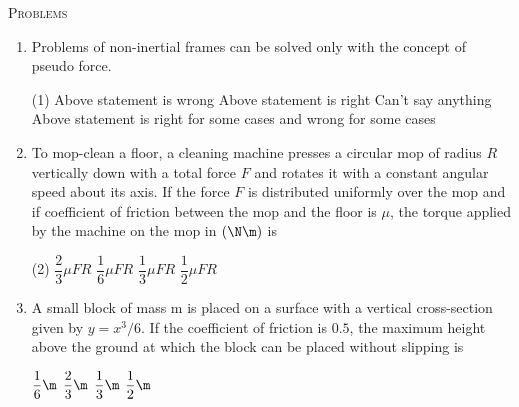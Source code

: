 \documentclass{article}
\renewcommand{\ans}{\quad}
\begin{document}
\begin{center}
    \textsc{Problems}
\end{center}
\begin{enumerate}

    \item Problems of non-inertial frames can be solved only with the concept of pseudo force.
        \begin{tasks}(1)
            \task Above statement is wrong\ans
            \task Above statement is right
            \task Can't say anything
            \task Above statement is right for some cases and wrong for some cases
        \end{tasks}

        \item To mop-clean a floor, a cleaning machine presses a circular mop of radius $R$ vertically down with a total force $F$ and rotates it with a constant angular speed about its axis. If the force $F$ is distributed uniformly over the mop and if coefficient of friction between the mop and the floor is $\mu$, the torque applied by the machine on the mop in $(\N\m)$ is
        \begin{tasks}(2)
            \task $\dfrac{2}{3}\mu FR$\ans
            \task $\dfrac{1}{6}\mu FR$
            \task $\dfrac{1}{3}\mu FR$
            \task $\dfrac{1}{2}\mu FR$
        \end{tasks}

        \item A small block of mass m is placed on a surface with a vertical cross-section given by $y = x^3 / 6$. If the coefficient of friction is $0.5$, the maximum height above the ground at which the block can be placed without slipping is
        \begin{multicols}{2}
            \begin{tasks}
                \task $\dfrac{1}{6}\m$\ans
                \task $\dfrac{2}{3}\m$
                \task $\dfrac{1}{3}\m$
                \task $\dfrac{1}{2}\m$
            \end{tasks}
        \columnbreak
            \begin{center}
            \end{center}
        \end{multicols}
            


\end{enumerate}
\end{document}
